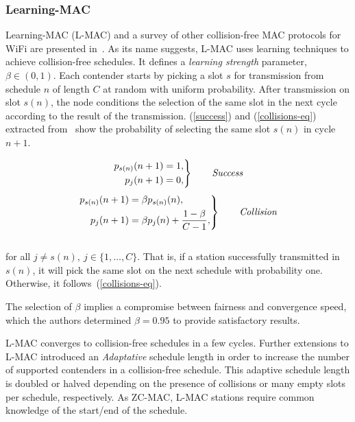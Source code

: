 \documentclass[a4paper]{article}
\begin{document}
\subsubsection{Learning-MAC}
Learning-MAC (L-MAC) and a survey of other collision-free MAC protocols for WiFi are presented in~\cite{L_MAC}. As its name suggests, L-MAC uses learning techniques to achieve collision-free schedules. It defines a \emph{learning strength} parameter, $\beta\in(0,1)$. Each contender starts by picking a slot $s$ for transmission from schedule $n$ of length $C$ at random with uniform probability. After transmission on slot $s(n)$, the node conditions the selection of the same slot in the next cycle according to the result of the transmission. (\ref{success}) and (\ref{collisions-eq}) extracted from~\cite{L_MAC} show the probability of selecting the same slot $s(n)$ in cycle $n+1$.

\begin{equation} \label{success}
		\left. \begin{aligned}
			p_{s(n)}(n+1)&=1,\\
			p_{j}(n+1)&=0,
		\end{aligned}
	\right\}
	\qquad \text{\emph{Success}}
\end{equation}
\begin{equation} \label{collisions-eq}
	\left. \begin{aligned}
			p_{s(n)}(n+1)&=\beta p_{s(n)}(n),\\
			p_{j}(n+1)&=\beta p_{j}(n)+\frac{1-\beta}{C -1},
		\end{aligned}
	\right\}
	\qquad \text{\emph{Collision}}
\end{equation}
\\
for all $j\neq s(n),~j\in \{1,\dots ,C\}$. That is, if a station successfully transmitted in $s(n)$, it will pick the same slot on the next schedule with probability one. Otherwise, it follows~(\ref{collisions-eq}).

The selection of $\beta$ implies a compromise between fairness and convergence speed, which the authors determined $\beta=0.95$ to provide satisfactory results.

L-MAC converges to collision-free schedules in a few cycles. Further extensions to L-MAC introduced an \emph{Adaptative} schedule length in order to increase the number of supported contenders in a collision-free schedule. This adaptive schedule length is doubled or halved depending on the presence of collisions or many empty slots per schedule, respectively. As ZC-MAC, L-MAC stations require common knowledge of the start/end of the schedule. 
\end{document}
